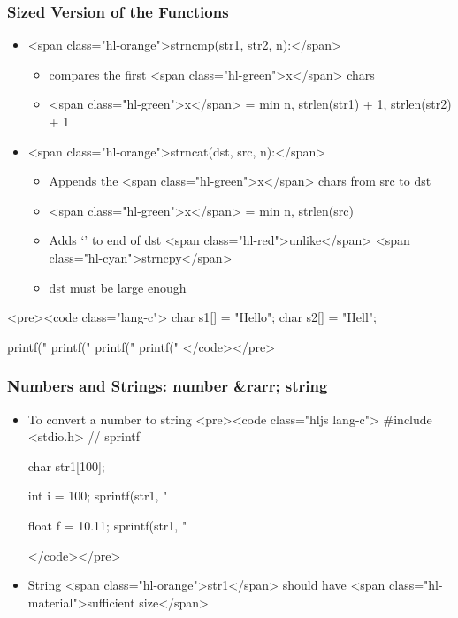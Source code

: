 \documentclass{../c-lecture}
\begin{document}
\begin{frame}
  \begin{frame}
    \frametitle{Sized Version of the Functions}
    \begin{itemize}
      \item <span class="hl-orange">strncmp(str1, str2, n):</span>
      \begin{itemize}
        \item compares the first <span class="hl-green">x</span> chars
        \item
          <span class="hl-green">x</span> = min{ n, strlen(str1) + 1,
          strlen(str2) + 1 }

      \end{itemize}
      \item <span class="hl-orange">strncat(dst, src, n):</span>
      \begin{itemize}
        \item
          Appends the <span class="hl-green">x</span> chars from src to dst

        \item <span class="hl-green">x</span> = min{ n, strlen(src) }
        \item
          Adds ‘\0’ to end of dst <span class="hl-red">unlike</span>
          <span class="hl-cyan">strncpy</span>

        \item dst must be large enough
      \end{itemize}
    \end{itemize}
  \end{frame}
  \begin{frame}
    <pre><code class="lang-c">
char s1[] = "Hello";
char s2[] = "Hell";

printf("%
printf("%
printf("%
printf("%
    </code></pre>
  \end{frame}
\end{frame}
\begin{frame}
  \frametitle{Numbers and Strings: number &rarr; string}
  \begin{itemize}
    \item To convert a number to string
    <pre><code class="hljs lang-c">
#include <stdio.h> // sprintf

char str1[100];

int i = 100;
sprintf(str1, "%

float f = 10.11;
sprintf(str1, "%

    </code></pre>
    \item
      String <span class="hl-orange">str1</span> should have
      <span class="hl-material">sufficient size</span>

  \end{itemize}
\end{frame}
\end{document}
